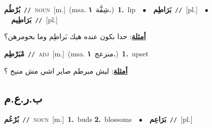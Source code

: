 \documentclass[10pt,a4paper,twoside]{article} %
\begin{document}
\begin{multicols}{2}
{\setlength\topsep{0pt}\textbf{\foreignlanguage{arabic}{بُرْطُم}}\ {\color{gray}\texttt{//}\color{black}}\ \textsc{noun}\ [m.]\ \color{gray}(msa. \foreignlanguage{arabic}{شِفَّة}~\foreignlanguage{arabic}{\textbf{١.}})\color{black}\ \textbf{1.}~lip\ \ $\bullet$\ \ \setlength\topsep{0pt}\textbf{\foreignlanguage{arabic}{بَرَاطِم}}\ {\color{gray}\texttt{//}\color{black}}\ [pl.]\ \ $\bullet$\ \ \setlength\topsep{0pt}\textbf{\foreignlanguage{arabic}{بَرَاطِيم}}\ {\color{gray}\texttt{//}\color{black}}\ [pl.]\  \begin{flushright}\color{gray}\foreignlanguage{arabic}{\textbf{\underline{\foreignlanguage{arabic}{أمثلة}}}: حدا بكون عنده هيك بَراطِم وما بحومرهن؟}\end{flushright}\color{black}} \vspace{2mm}

{\setlength\topsep{0pt}\textbf{\foreignlanguage{arabic}{مْبَرْطِم}}\ {\color{gray}\texttt{//}\color{black}}\ \textsc{adj}\ [m.]\ \color{gray}(msa. \foreignlanguage{arabic}{منزعج}~\foreignlanguage{arabic}{\textbf{١.}})\color{black}\ \textbf{1.}~upset\  \begin{flushright}\color{gray}\foreignlanguage{arabic}{\textbf{\underline{\foreignlanguage{arabic}{أمثلة}}}: ليش مبرطم صاير اشي مش منيح ؟}\end{flushright}\color{black}} \vspace{2mm}

\vspace{-3mm}
\subsection*{\color{blue}\foreignlanguage{arabic}{ب.ر.ع.م}\color{blue}{}} 

{\setlength\topsep{0pt}\textbf{\foreignlanguage{arabic}{بُرْعُم}}\ {\color{gray}\texttt{//}\color{black}}\ \textsc{noun}\ [m.]\ \textbf{1.}~buds  \textbf{2.}~blossoms\ \ $\bullet$\ \ \setlength\topsep{0pt}\textbf{\foreignlanguage{arabic}{بَرَاعِم}}\ {\color{gray}\texttt{//}\color{black}}\ [pl.]\ } \vspace{2mm}


\end{multicols}
\end{document}
